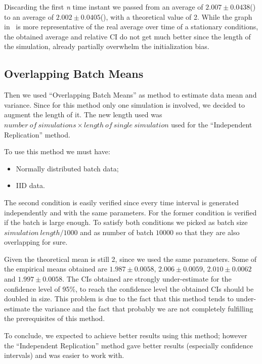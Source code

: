 \documentclass[10pt,a4paper]{article}
\begin{document}
Discarding the first \emph{n} time instant we passed from an average of \(2.007 \pm 0.0438\)() to an average of \(2.002 \pm 0.0405\)(), with a theoretical value of 2. While the graph in~ is more representative of the real average over time of a stationary conditions, the obtained average and relative CI do not get much better since the length of the simulation, already partially overwhelm the initialization bias.

\subsection*{Overlapping Batch Means}

Then we used ``Overlapping Batch Means'' as method to estimate data mean and variance. Since for this method only one simulation is involved, we decided to augment the length of it. The new length used was \(\mathit{number~of~simulations}\times\mathit{length~of~single~simulation}\) used for the ``Independent Replication'' method.

To use this method we must have:
\begin{itemize}
\item Normally distributed batch data;
\item IID data.
\end{itemize}

The second condition is easily verified since every time interval is generated independently and with the same parameters. For the former condition is verified if the batch is large enough. To satisfy both conditions we picked as batch size \(\mathit{simulation~length} / 1000\) and as number of batch \(10000\) so that they are also overlapping for sure.

Given the theoretical mean is still 2, since we used the same parameters. Some of the empirical means obtained are \( 1.987 \pm 0.0058\), \(2.006 \pm 0.0059\), \(2.010 \pm 0.0062\) and \(1.997 \pm 0.0058\). The CIs obtained are strongly under-estimate for the confidence level of 95\%, to reach the confidence level the obtained CIs should be doubled in size. This problem is due to the fact that this method tends to under-estimate the variance and the fact that probably we are not completely fulfilling the prerequisites of this method.

To conclude, we expected to achieve better results using this method; however the ``Independent Replication'' method gave better results (especially confidence intervals) and was easier to work with.
\end{document}
